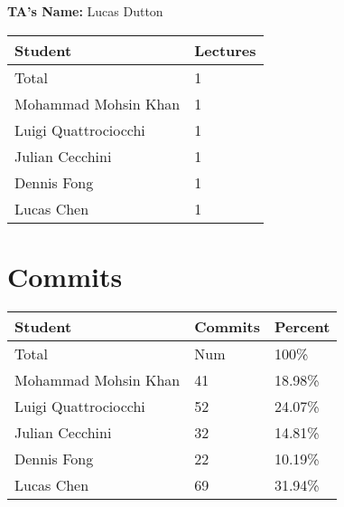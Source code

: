 \documentclass{article}
\begin{document}

\noindent \textbf{TA's Name: } Lucas Dutton

\begin{table}[H]
\centering
\begin{tabular}{ll}
\toprule
\textbf{Student} & \textbf{Lectures}\\
\midrule
Total & 1\\
Mohammad Mohsin Khan & 1\\
Luigi Quattrociocchi & 1\\
Julian Cecchini & 1\\
Dennis Fong & 1\\
Lucas Chen & 1\\
\bottomrule
\end{tabular}
\end{table}


\section{Commits}


\begin{table}[H]
\centering
\begin{tabular}{lll}
\toprule
\textbf{Student} & \textbf{Commits} & \textbf{Percent}\\
\midrule
Total & Num & 100\% \\
Mohammad Mohsin Khan & 41 & 18.98\% \\
Luigi Quattrociocchi & 52 & 24.07\% \\
Julian Cecchini & 32 & 14.81\% \\
Dennis Fong & 22 & 10.19\% \\
Lucas Chen & 69 & 31.94\% \\
\bottomrule
\end{tabular}
\end{table}

\end{document}
